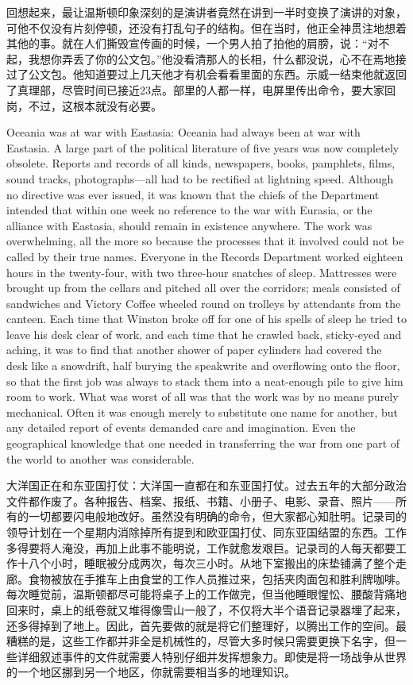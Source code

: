 \begin{paracol}{2}
\switchcolumn

回想起来，最让温斯顿印象深刻的是演讲者竟然在讲到一半时变换了演讲的对象，可他不仅没有片刻停顿，还没有打乱句子的结构。但在当时，他正全神贯注地想着其他的事。就在人们撕毁宣传画的时候，一个男人拍了拍他的肩膀，说：``对不起，我想你弄丢了你的公文包。''他没看清那人的长相，什么都没说，心不在焉地接过了公文包。他知道要过上几天他才有机会看看里面的东西。示威一结束他就返回了真理部，尽管时间已接近23点。部里的人都一样，电屏里传出命令，要大家回岗，不过，这根本就没有必要。

\switchcolumn*

Oceania was at war with Eastasia: Oceania had always been at war with
Eastasia. A large part of the political literature of five years was now
completely obsolete. Reports and records of all kinds, newspapers,
books, pamphlets, films, sound tracks, photographs---all had to be
rectified at lightning speed. Although no directive was ever issued, it
was known that the chiefs of the Department intended that within one
week no reference to the war with Eurasia, or the alliance with
Eastasia, should remain in existence anywhere. The work was
overwhelming, all the more so because the processes that it involved
could not be called by their true names. Everyone in the Records
Department worked eighteen hours in the twenty-four, with two three-hour
snatches of sleep. Mattresses were brought up from the cellars and
pitched all over the corridors; meals consisted of sandwiches and
Victory Coffee wheeled round on trolleys by attendants from the canteen.
Each time that Winston broke off for one of his spells of sleep he tried
to leave his desk clear of work, and each time that he crawled back,
sticky-eyed and aching, it was to find that another shower of paper
cylinders had covered the desk like a snowdrift, half burying the
speakwrite and overflowing onto the floor, so that the first job was
always to stack them into a neat-enough pile to give him room to work.
What was worst of all was that the work was by no means purely
mechanical. Often it was enough merely to substitute one name for
another, but any detailed report of events demanded care and
imagination. Even the geographical knowledge that one needed in
transferring the war from one part of the world to another was
considerable.

\switchcolumn

大洋国正在和东亚国打仗：大洋国一直都在和东亚国打仗。过去五年的大部分政治文件都作废了。各种报告、档案、报纸、书籍、小册子、电影、录音、照片——所有的一切都要闪电般地改好。虽然没有明确的命令，但大家都心知肚明。记录司的领导计划在一个星期内消除掉所有提到和欧亚国打仗、同东亚国结盟的东西。工作多得要将人淹没，再加上此事不能明说，工作就愈发艰巨。记录司的人每天都要工作十八个小时，睡眠被分成两次，每次三小时。从地下室搬出的床垫铺满了整个走廊。食物被放在手推车上由食堂的工作人员推过来，包括夹肉面包和胜利牌咖啡。每次睡觉前，温斯顿都尽可能将桌子上的工作做完，但当他睡眼惺忪、腰酸背痛地回来时，桌上的纸卷就又堆得像雪山一般了，不仅将大半个语音记录器埋了起来，还多得掉到了地上。因此，首先要做的就是将它们整理好，以腾出工作的空间。最糟糕的是，这些工作都并非全是机械性的，尽管大多时候只需要更换下名字，但一些详细叙述事件的文件就需要人特别仔细并发挥想象力。即使是将一场战争从世界的一个地区挪到另一个地区，你就需要相当多的地理知识。


\end{paracol}
